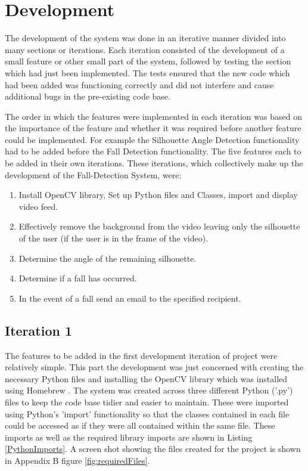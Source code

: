\documentclass[11pt,a4paper]{report}
\begin{document}
\pagebreak

\section{Development}
The development of the system was done in an iterative manner divided into many sections or iterations. Each iteration consisted of the development of a small feature or other small part of the system, followed by testing the section which had just been implemented. The tests ensured that the new code which had been added was functioning correctly and did not interfere and cause additional bugs in the pre-existing code base.

The order in which the features were implemented in each iteration was based on the importance of the feature and whether it was required before another feature could be implemented. For example the Silhouette Angle Detection functionality had to be added before the Fall Detection functionality. The five features each to be added in their own iterations. These iterations, which collectively make up the development of the Fall-Detection System, were:

\begin{enumerate}
\item Install OpenCV library, Set up Python files and Classes, import and display video feed.
\item Effectively remove the background from the video leaving only the silhouette of the user (if the user is in the frame of the video).
\item Determine the angle of the remaining silhouette.
\item Determine if a fall has occurred.
\item In the event of a fall send an email to the specified recipient.
\end{enumerate}

\subsection{Iteration 1}

The features to be added in the first development iteration of project were relatively simple. This part the development was just concerned with creating the necessary Python files and installing the OpenCV library which was installed using Homebrew \citep{Homebrew}. The system was created across three different Python ('.py') files to keep the code base tidier and easier to maintain. These were imported using Python's 'import' functionality so that the classes contained in each file could be accessed as if they were all contained within the same file. These imports as well as the required library imports are shown in Listing \ref{PythonImports}. A screen shot showing the files created for the project is shown in Appendix B figure \ref{fig:requiredFiles}. 
\end{document}
